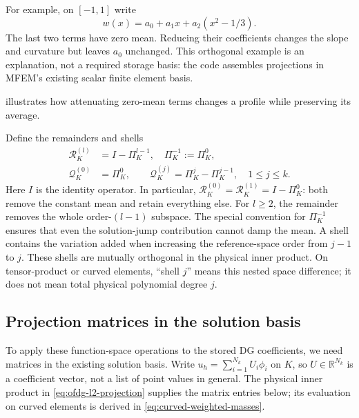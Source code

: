 For example, on $[-1,1]$ write
\begin{equation}
 w(x)=a_0+a_1x+a_2(x^2-1/3).
\end{equation}
The last two terms have zero mean. Reducing their coefficients changes the
slope and curvature but leaves $a_0$ unchanged. This orthogonal example is an
explanation, not a required storage basis: the code assembles projections in
MFEM's existing scalar finite element basis.

 illustrates how attenuating zero-mean terms
changes a profile while preserving its average.


Define the remainders and shells
\begin{align}
 \mathcal R_K^{(l)}&=I-\Pi_K^{l-1},\quad \Pi_K^{-1}:=\Pi_K^0,
 \label{eq:ofdg-high-pass}\\
 \mathcal Q_K^{(0)}&=\Pi_K^0,\qquad
 \mathcal Q_K^{(j)}=\Pi_K^j-\Pi_K^{j-1},\quad 1\leq j\leq k.
 \label{eq:ofdg-modal-shells}
\end{align}
Here $I$ is the identity operator. In particular,
$\mathcal R_K^{(0)}=\mathcal R_K^{(1)}=I-\Pi_K^0$: both remove the
constant mean and retain everything else. For $l\geq2$, the remainder
removes the whole order-$(l-1)$ subspace. The special convention for
$\Pi_K^{-1}$ ensures that even the solution-jump contribution cannot damp
the mean. A shell contains the variation added when increasing the reference-space order
from $j-1$ to $j$. These shells are mutually orthogonal in the physical inner
product. On tensor-product or curved elements, ``shell $j$'' means this nested
space difference; it does not mean total physical polynomial degree $j$.

\subsection{Projection matrices in the solution basis}
\label{sec:ofdg-projection-coefficients}
To apply these function-space operations to the stored DG coefficients, we
need matrices in the existing solution basis. Write
$u_h=\sum_{i=1}^{N_k}U_i\phi_i$ on $K$, so $U\in\mathbb R^{N_k}$
is a coefficient vector, not a list of point values in general.
The physical inner product in \cref{eq:ofdg-l2-projection} supplies the
matrix entries below; its evaluation on curved elements is derived in
\cref{eq:curved-weighted-masses}.


